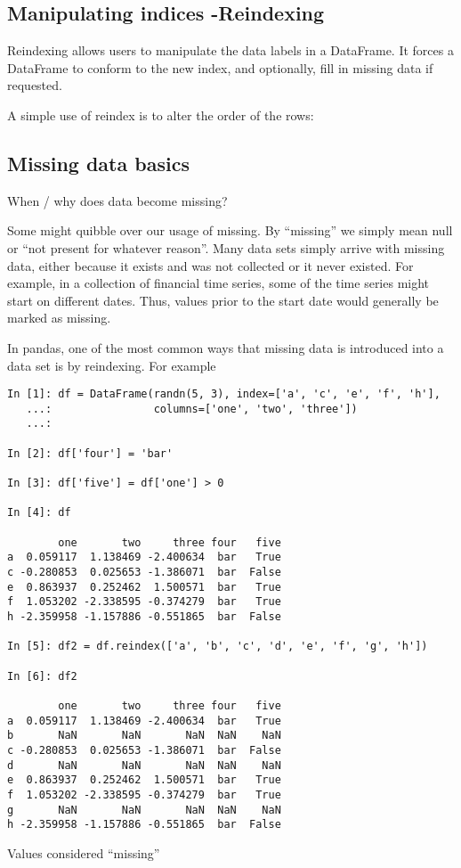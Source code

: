 \documentclass[11pt]{article} %
\begin{document}
\newpage
\subsection{Manipulating indices -Reindexing}

Reindexing allows users to manipulate the data labels in a DataFrame. It forces a DataFrame to conform to the new index, and optionally, fill in missing data if requested.


A simple use of reindex is to alter the order of the rows:
\newpage
\subsection{Missing data basics}
When / why does data become missing?

Some might quibble over our usage of missing. By “missing” we simply mean null or “not present for whatever reason”. Many data sets simply arrive with missing data, either because it exists and was not collected or it never existed. For example, in a collection of financial time series, some of the time series might start on different dates. Thus, values prior to the start date would generally be marked as missing.

In pandas, one of the most common ways that missing data is introduced into a data set is by reindexing. For example

\begin{verbatim}
In [1]: df = DataFrame(randn(5, 3), index=['a', 'c', 'e', 'f', 'h'],
   ...:                columns=['one', 'two', 'three'])
   ...: 

In [2]: df['four'] = 'bar'

In [3]: df['five'] = df['one'] > 0

In [4]: df

        one       two     three four   five
a  0.059117  1.138469 -2.400634  bar   True
c -0.280853  0.025653 -1.386071  bar  False
e  0.863937  0.252462  1.500571  bar   True
f  1.053202 -2.338595 -0.374279  bar   True
h -2.359958 -1.157886 -0.551865  bar  False

In [5]: df2 = df.reindex(['a', 'b', 'c', 'd', 'e', 'f', 'g', 'h'])

In [6]: df2

        one       two     three four   five
a  0.059117  1.138469 -2.400634  bar   True
b       NaN       NaN       NaN  NaN    NaN
c -0.280853  0.025653 -1.386071  bar  False
d       NaN       NaN       NaN  NaN    NaN
e  0.863937  0.252462  1.500571  bar   True
f  1.053202 -2.338595 -0.374279  bar   True
g       NaN       NaN       NaN  NaN    NaN
h -2.359958 -1.157886 -0.551865  bar  False
\end{verbatim}
Values considered “missing”
\end{document}
